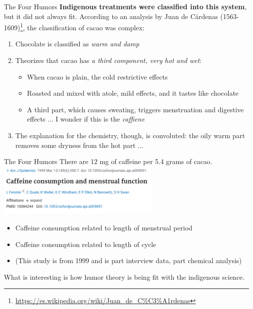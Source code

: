 \documentclass{beamer}
\begin{document}
\begin{frame}{The Four Humors}
\small
\alert{\textbf{Indigenous treatments were classified into this system}, but it did not always fit}.  According to an analysis by Juan de C\'{a}rdenas (1563-1609)\footnote{\url{https://es.wikipedia.org/wiki/Juan_de_C\%C3\%A1rdenas}}, the classification of cacao was complex:
\begin{enumerate}
\item Chocolate is classified as \textit{warm and damp}
\item Theorizes that cacao has \textit{a third component, very hot and wet}:
\begin{itemize}
\item When cacao is plain, the cold restrictive effects
\item Roasted and mixed with atole, mild effects, and it tastes like chocolate
\item A third part, which causes sweating, triggers menstruation and digestive effects ... I wonder if this is the \textit{caffiene}
\end{itemize}
\item The explanation for the chemistry, though, is convoluted: the oily warm part removes some dryness from the hot part ...
\end{enumerate}
\end{frame}

\begin{frame}{The Four Humors}
\small
There are 12 mg of caffeine per 5.4 grams of cacao. \\ \vspace{0.5cm}
\includegraphics[width=8cm]{figures/menses.png}
\begin{itemize}
\item Caffeine consumption related to length of menstrual period
\item Caffeine consumption related to length of cycle
\item (This study is from 1999 and is part interview data, part chemical analysis)
\end{itemize}
What is interesting is how humor theory is being fit with the indigenous science.
\end{frame}
\end{document}
